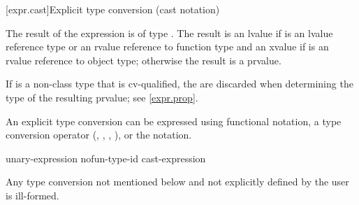 [expr.cast]{Explicit type conversion (cast notation)}%

\pnum
The result of the expression   is
of type . The result is an lvalue if  is an lvalue
reference type or an rvalue reference to function type and an xvalue if 
is an rvalue reference to object type; otherwise the result is a prvalue.
\begin{note}
If  is a non-class type that is cv-qualified, the
 are discarded when determining the type of the
resulting prvalue; see \ref{expr.prop}.
\end{note}

\pnum
An explicit type conversion can be expressed using functional
notation, a type conversion operator
(, , ,
), or the  notation.

\begin{bnf}
\br
    unary-expression\br
    \terminal{(} nofun-type-id \terminal{)} cast-expression
\end{bnf}

\pnum
Any type conversion not mentioned below and not explicitly defined by
the user is ill-formed.

